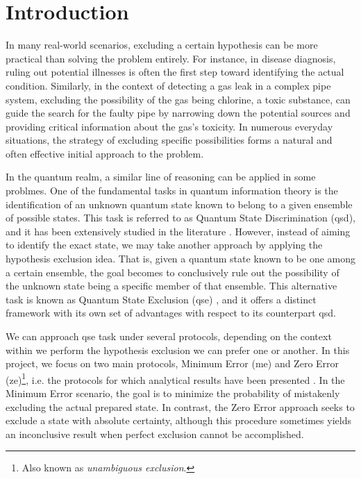 \documentclass[12pt,letterpaper]{article}
\begin{document}
\section{Introduction}

\hspace{20pt}In many real-world scenarios, excluding a certain hypothesis can be more practical than solving the problem entirely. For instance, in disease diagnosis, ruling out potential illnesses is often the first step toward identifying the actual condition. Similarly, in the context of detecting a gas leak in a complex pipe system, excluding the possibility of the gas being chlorine, a toxic substance, can guide the search for the faulty pipe by narrowing down the potential sources and providing critical information about the gas's toxicity. In numerous everyday situations, the strategy of excluding specific possibilities forms a natural and often effective initial approach to the problem.

In the quantum realm, a similar line of reasoning can be applied in some problmes. One of the fundamental tasks in quantum information theory is the identification of an unknown quantum state known to belong to a given ensemble of possible states. This task is referred to as Quantum State Discrimination (\gls{qsd}), and it has been extensively studied in the literature \cite{DiscriminationArticle}. However, instead of aiming to identify the exact state, we may take another approach by applying the hypothesis exclusion idea. That is, given a quantum state known to be one among a certain ensemble, the goal becomes to conclusively rule out the possibility of the unknown state being a specific member of that ensemble. This alternative task is known as Quantum State Exclusion (\gls{qse}) \cite{PhysicsExclusionSource}, and it offers a distinct framework with its own set of advantages \cite{piani2020quantum} with respect to its counterpart \gls{qsd}.

We can approach \gls{qse} task under several protocols, depending on the context within we perform the hypothesis exclusion we can prefer one or another. In this project, we focus on two main protocols, Minimum Error (\gls{me}) and Zero Error (\gls{ze})\footnote{Also known as \emph{unambiguous exclusion}.}, i.e. the protocols for which analytical results have been presented \cite{MainPaper}. In the Minimum Error scenario, the goal is to minimize the probability of mistakenly excluding the actual prepared state. In contrast, the Zero Error approach seeks to exclude a state with absolute certainty, although this procedure sometimes yields an inconclusive result when perfect exclusion cannot be accomplished.
\end{document}
